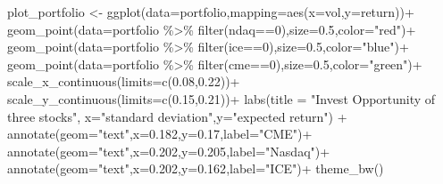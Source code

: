 \documentclass[
  a4paper,
  DIV=11,
  numbers=noendperiod]{scrreprt}
\newenvironment{Shaded}{\begin{snugshade}}{\end{snugshade}}
\newcommand{\AttributeTok}[1]{\textcolor[rgb]{0.40,0.45,0.13}{#1}}
\newcommand{\DecValTok}[1]{\textcolor[rgb]{0.68,0.00,0.00}{#1}}
\newcommand{\FloatTok}[1]{\textcolor[rgb]{0.68,0.00,0.00}{#1}}
\newcommand{\FunctionTok}[1]{\textcolor[rgb]{0.28,0.35,0.67}{#1}}
\newcommand{\NormalTok}[1]{\textcolor[rgb]{0.00,0.23,0.31}{#1}}
\newcommand{\OtherTok}[1]{\textcolor[rgb]{0.00,0.23,0.31}{#1}}
\newcommand{\SpecialCharTok}[1]{\textcolor[rgb]{0.37,0.37,0.37}{#1}}
\newcommand{\StringTok}[1]{\textcolor[rgb]{0.13,0.47,0.30}{#1}}
\begin{document}
\begin{Shaded}
\begin{Highlighting}[]
\NormalTok{plot\_portfolio }\OtherTok{\textless{}{-}} \FunctionTok{ggplot}\NormalTok{(}\AttributeTok{data=}\NormalTok{portfolio,}\AttributeTok{mapping=}\FunctionTok{aes}\NormalTok{(}\AttributeTok{x=}\NormalTok{vol,}\AttributeTok{y=}\NormalTok{return))}\SpecialCharTok{+}
  \FunctionTok{geom\_point}\NormalTok{(}\AttributeTok{data=}\NormalTok{portfolio }\SpecialCharTok{\%\textgreater{}\%} \FunctionTok{filter}\NormalTok{(ndaq}\SpecialCharTok{==}\DecValTok{0}\NormalTok{),}\AttributeTok{size=}\FloatTok{0.5}\NormalTok{,}\AttributeTok{color=}\StringTok{"red"}\NormalTok{)}\SpecialCharTok{+}
  \FunctionTok{geom\_point}\NormalTok{(}\AttributeTok{data=}\NormalTok{portfolio }\SpecialCharTok{\%\textgreater{}\%} \FunctionTok{filter}\NormalTok{(ice}\SpecialCharTok{==}\DecValTok{0}\NormalTok{),}\AttributeTok{size=}\FloatTok{0.5}\NormalTok{,}\AttributeTok{color=}\StringTok{"blue"}\NormalTok{)}\SpecialCharTok{+}
  \FunctionTok{geom\_point}\NormalTok{(}\AttributeTok{data=}\NormalTok{portfolio }\SpecialCharTok{\%\textgreater{}\%} \FunctionTok{filter}\NormalTok{(cme}\SpecialCharTok{==}\DecValTok{0}\NormalTok{),}\AttributeTok{size=}\FloatTok{0.5}\NormalTok{,}\AttributeTok{color=}\StringTok{"green"}\NormalTok{)}\SpecialCharTok{+}
  \FunctionTok{scale\_x\_continuous}\NormalTok{(}\AttributeTok{limits=}\FunctionTok{c}\NormalTok{(}\FloatTok{0.08}\NormalTok{,}\FloatTok{0.22}\NormalTok{))}\SpecialCharTok{+}
  \FunctionTok{scale\_y\_continuous}\NormalTok{(}\AttributeTok{limits=}\FunctionTok{c}\NormalTok{(}\FloatTok{0.15}\NormalTok{,}\FloatTok{0.21}\NormalTok{))}\SpecialCharTok{+}
  \FunctionTok{labs}\NormalTok{(}\AttributeTok{title =} \StringTok{"Invest Opportunity of three stocks"}\NormalTok{,}
       \AttributeTok{x=}\StringTok{"standard deviation"}\NormalTok{,}\AttributeTok{y=}\StringTok{"expected return"}\NormalTok{) }\SpecialCharTok{+}
  \FunctionTok{annotate}\NormalTok{(}\AttributeTok{geom=}\StringTok{"text"}\NormalTok{,}\AttributeTok{x=}\FloatTok{0.182}\NormalTok{,}\AttributeTok{y=}\FloatTok{0.17}\NormalTok{,}\AttributeTok{label=}\StringTok{"CME"}\NormalTok{)}\SpecialCharTok{+}
  \FunctionTok{annotate}\NormalTok{(}\AttributeTok{geom=}\StringTok{"text"}\NormalTok{,}\AttributeTok{x=}\FloatTok{0.202}\NormalTok{,}\AttributeTok{y=}\FloatTok{0.205}\NormalTok{,}\AttributeTok{label=}\StringTok{"Nasdaq"}\NormalTok{)}\SpecialCharTok{+}
  \FunctionTok{annotate}\NormalTok{(}\AttributeTok{geom=}\StringTok{"text"}\NormalTok{,}\AttributeTok{x=}\FloatTok{0.202}\NormalTok{,}\AttributeTok{y=}\FloatTok{0.162}\NormalTok{,}\AttributeTok{label=}\StringTok{"ICE"}\NormalTok{)}\SpecialCharTok{+}
  \FunctionTok{theme\_bw}\NormalTok{()}


\end{Highlighting}
\end{Shaded}
\end{document}
